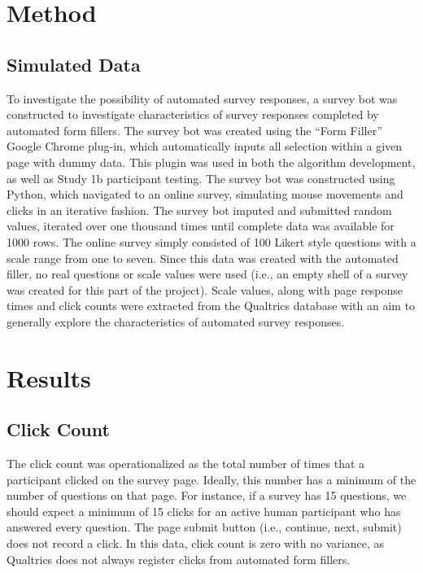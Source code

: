 \documentclass[english,man]{apa6}
\theoremstyle{definition}
\theoremstyle{definition}
\theoremstyle{definition}
\theoremstyle{remark}
\begin{document}
\section{Method}\label{method}

\subsection{Simulated Data}\label{simulated-data}

To investigate the possibility of automated survey responses, a survey
bot was constructed to investigate characteristics of survey responses
completed by automated form fillers. The survey bot was created using
the \enquote{Form Filler} Google Chrome plug-in, which automatically
inputs all selection within a given page with dummy data. This plugin
was used in both the algorithm development, as well as Study 1b
participant testing. The survey bot was constructed using Python, which
navigated to an online survey, simulating mouse movements and clicks in
an iterative fashion. The survey bot imputed and submitted random
values, iterated over one thousand times until complete data was
available for 1000 rows. The online survey simply consisted of 100
Likert style questions with a scale range from one to seven. Since this
data was created with the automated filler, no real questions or scale
values were used (i.e., an empty shell of a survey was created for this
part of the project). Scale values, along with page response times and
click counts were extracted from the Qualtrics database with an aim to
generally explore the characteristics of automated survey responses.

\section{Results}\label{results}

\subsection{Click Count}\label{click-count}

The click count was operationalized as the total number of times that a
participant clicked on the survey page. Ideally, this number has a
minimum of the number of questions on that page. For instance, if a
survey has 15 questions, we should expect a minimum of 15 clicks for an
active human participant who has answered every question. The page
submit button (i.e., continue, next, submit) does not record a click. In
this data, click count is zero with no variance, as Qualtrics does not
always register clicks from automated form fillers.
\end{document}
